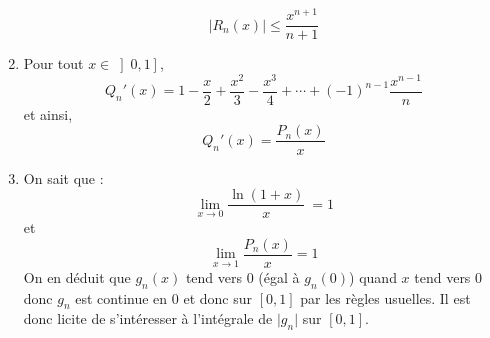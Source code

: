 \documentclass[a4paper,twoside,french,10pt]{VcCours}
\begin{document}
\begin{enumerate}
$$ \boxed{\left\vert R_{n}\left(  x\right)  \right\vert \leq
\dfrac{x^{n+1}}{n+1}}$$

\item Pour tout $x\in\left]  0,1\right]$,
$$ Q_{n}'\left(  x\right)  =1-\dfrac{x}{2}+\dfrac{x^{2}}{3}-\dfrac{x^{3}}{4}+\cdots+\left(  -1\right)^{n-1}\dfrac{x^{n-1}}{n}$$
et ainsi,
$$ \boxed{Q_{n}'\left(  x\right)=\dfrac{P_{n}\left(  x\right)  }{x}}$$


\item On sait que :
$$ \lim_{x \rightarrow 0} \dfrac{\ln\left(  1+x\right)  }{x}\ =1$$
et 
$$ \lim_{x \rightarrow 1} \dfrac{P_{n}\left(  x\right)  }{x}=1$$
On en déduit que $g_{n}\left(  x\right)$ tend vers $0$ (égal à $g_n(0)$) quand $x$ tend vers $0$ donc $g_n$ est continue en $0$ et donc sur $[0,1]$ par les règles usuelles. Il est donc licite de s'intéresser à l'intégrale de $\vert g_n\vert$ sur $[0,1]$.

\medskip


\end{enumerate}
\end{document}
